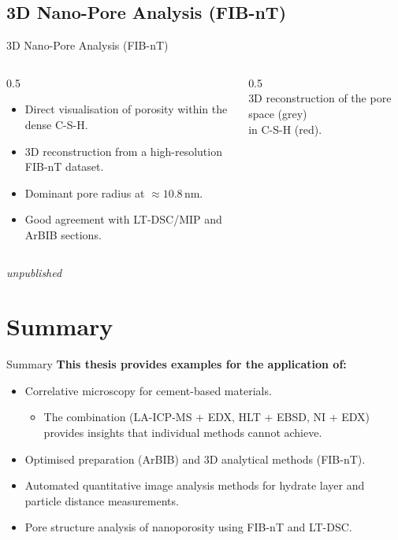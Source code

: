\documentclass[10pt,aspectratio=169]{beamer}
\begin{document}
\subsection{3D Nano-Pore Analysis (FIB-nT)}
\begin{frame}{3D Nano-Pore Analysis (FIB-nT)}
  \begin{columns}
    \begin{column}{0.5\textwidth}
      \begin{itemize}
        \item Direct visualisation of porosity within the dense C-S-H.
        \item 3D reconstruction from a high-resolution FIB-nT dataset.
        \item Dominant pore radius at $\approx 10.8$\,nm.
        \item Good agreement with LT-DSC/MIP and ArBIB sections.
      \end{itemize}
    \end{column}
    \begin{column}{0.5\textwidth}
      \centering
      \\
      \footnotesize 3D reconstruction of the pore space (grey)\\in C-S-H (red).
    \end{column}
  \end{columns}
  \vfill\raggedleft\tiny\itshape unpublished
\end{frame}

\section{Summary}
\begin{frame}{Summary}
  \textbf{This thesis provides examples for the application of:}
  \begin{itemize}
    \item Correlative microscopy for cement-based materials.
    \begin{itemize}
        \item The combination (LA-ICP-MS + EDX, HLT + EBSD, NI + EDX) provides insights that individual methods cannot achieve.
    \end{itemize}
    \item Optimised preparation (ArBIB) and 3D analytical methods (FIB-nT).
    \item Automated quantitative image analysis methods for hydrate layer and particle distance measurements.
    \item Pore structure analysis of nanoporosity using FIB-nT and LT-DSC.
  \end{itemize}
\end{frame} 
\end{document}
